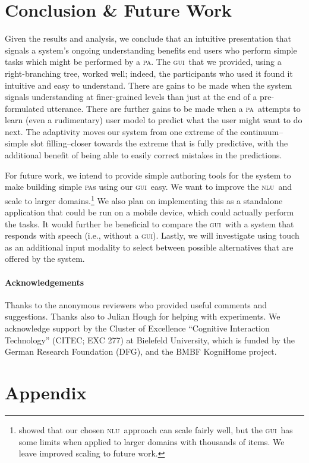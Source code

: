 \documentclass[11pt]{article}
\newcommand{\nlu}[0]{\textsc{nlu}}
\newcommand{\ui}[0]{\textsc{gui}}
\newcommand{\pa}[0]{\textsc{pa}}
\begin{document}
\section{Conclusion \& Future Work}

Given the results and analysis, we conclude that an intuitive presentation that signals a system's ongoing understanding benefits end users who perform simple tasks which might be performed by a \pa. The \ui\ that we provided, using a right-branching tree, worked well; indeed, the participants who used it found it intuitive and easy to understand. There are gains to be made when the system signals understanding at finer-grained levels than just at the end of a pre-formulated utterance. There are further gains to be made when a \pa\ attempts to learn (even a rudimentary) user model to predict what the user might want to do next. The adaptivity moves our system from one extreme of the continuum--simple slot filling--closer towards the extreme that is fully predictive, with the additional benefit of being able to easily correct mistakes in the predictions. 

For future work, we intend to provide simple authoring tools for the system to make building simple \pa s using our \ui\ easy. We want to improve the \nlu\ and scale to larger domains.\footnote{ showed that our chosen \nlu\ approach can scale fairly well, but the \ui\ has some limits when applied to larger domains with thousands of items. We leave improved scaling to future work.} We also plan on implementing this as a standalone application that could be run on a mobile device, which could actually perform the tasks. It would further be beneficial to compare the \ui\ with a system that responds with speech (i.e., without a \ui). Lastly, we  will investigate using touch as an additional input modality to select between possible alternatives that are offered by the system. 

\paragraph{Acknowledgements} Thanks to the anonymous reviewers who provided useful comments and suggestions. Thanks also to Julian Hough for helping with experiments. We acknowledge support by the Cluster of Excellence ``Cognitive Interaction Technology'' (CITEC; EXC 277) at Bielefeld University, which is funded by the German Research Foundation (DFG), and the BMBF KogniHome project. 

\section*{Appendix}
\end{document}
